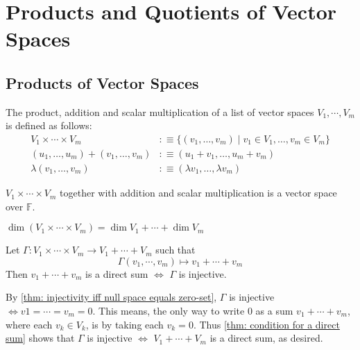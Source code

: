 \section{Products and Quotients of Vector Spaces}
\subsection{Products of Vector Spaces}

\setcounter{thm}{86}
\begin{mydef} 
  The product, addition and scalar multiplication of a list of vector spaces $V_1, \cdots, V_m$ is defined as follows:
  \begin{equation}
    \begin{aligned}
      V_1 \times \cdots \times V_m &:\equiv \{ (v_1, \dots, v_m) \mid v_1 \in V_1, \dots, v_m \in V_m\} \\
      (u_1, \dots, u_m) + (v_1, \dots, v_m) &:\equiv (u_1+v_1, \dots, u_m+v_m) \\
      \lambda (v_1, \dots, v_m) &:\equiv (\lambda v_1, \dots, \lambda v_m)
    \end{aligned}
  \end{equation}
\end{mydef}

\setcounter{thm}{88}
\begin{thm} 
  $V_1 \times \cdots \times V_m$ together with addition and scalar multiplication is a vector space over $\mathbb{F}$.
\end{thm}

\setcounter{thm}{91}
\begin{thm} 
  $\dim (V_1 \times \cdots \times V_m) = \dim V_1 + \cdots + \dim V_m$
\end{thm}

\begin{thm}
  Let $\Gamma: V_1 \times \cdots \times V_m \to V_1 + \cdots + V_m$ such that
  \begin{equation}
    \Gamma(v_1, \cdots, v_m) \mapsto v_1 + \cdots + v_m
  \end{equation}
  Then $v_1 + \cdots + v_m$ is a direct sum $\iff$ $\Gamma$ is injective.
\end{thm}
\begin{prf}
  By \ref{thm: injectivity iff null space equals zero-set}, $\Gamma$ is injective $\iff v1 = \cdots = v_m = 0$. This means, the only way to write $0$ as a sum $v_1 + \cdots + v_m$, where each $v_k \in V_k$, is by taking each $v_k=0$. Thus \ref{thm: condition for a direct sum} shows that $\Gamma$ is injective $\iff$ $V_1 + \cdots + V_m$ is a direct sum, as desired.
\end{prf}

